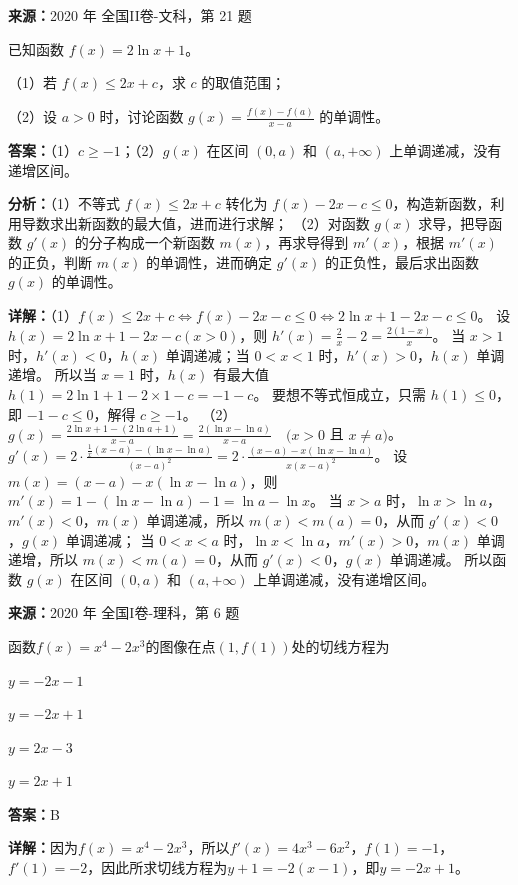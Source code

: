 \begin{question}[points=12]
\textbf{来源：}2020 年 全国II卷-文科，第 21 题\par
已知函数 $f(x)=2\ln x+1$。

（1）若 $f(x)\le 2x+c$，求 $c$ 的取值范围；

（2）设 $a>0$ 时，讨论函数 $g(x)=\frac{f(x)-f(a)}{x-a}$ 的单调性。
\begin{solution}
\textbf{答案：}（1）$c\ge -1$；（2）$g(x)$ 在区间 $(0,a)$ 和 $(a,+\infty)$ 上单调递减，没有递增区间。

\textbf{分析：}（1）不等式 $f(x)\le 2x+c$ 转化为 $f(x)-2x-c\le 0$，构造新函数，利用导数求出新函数的最大值，进而进行求解；
（2）对函数 $g(x)$ 求导，把导函数 $g'(x)$ 的分子构成一个新函数 $m(x)$，再求导得到 $m'(x)$，根据 $m'(x)$ 的正负，判断 $m(x)$ 的单调性，进而确定 $g'(x)$ 的正负性，最后求出函数 $g(x)$ 的单调性。

\textbf{详解：}（1）$f(x)\le 2x+c \Leftrightarrow f(x)-2x-c\le 0 \Leftrightarrow 2\ln x+1-2x-c\le 0$。
设 $h(x)=2\ln x+1-2x-c(x>0)$，则 $h'(x)=\frac{2}{x}-2=\frac{2(1-x)}{x}$。
当 $x>1$ 时，$h'(x)<0$，$h(x)$ 单调递减；当 $0<x<1$ 时，$h'(x)>0$，$h(x)$ 单调递增。
所以当 $x=1$ 时，$h(x)$ 有最大值 $h(1)=2\ln1+1-2\times1-c=-1-c$。
要想不等式恒成立，只需 $h(1)\le 0$，即 $-1-c\le 0$，解得 $c\ge -1$。
（2）$g(x)=\frac{2\ln x+1-(2\ln a+1)}{x-a}=\frac{2(\ln x-\ln a)}{x-a} \quad (x>0$ 且 $x\neq a)$。
$g'(x)=2\cdot\frac{\frac{1}{x}(x-a)-(\ln x-\ln a)}{(x-a)^2}=2\cdot\frac{(x-a)-x(\ln x-\ln a)}{x(x-a)^2}$。
设 $m(x)= (x-a)-x(\ln x-\ln a)$，则 $m'(x)=1-(\ln x-\ln a)-1 = \ln a - \ln x$。
当 $x>a$ 时，$\ln x>\ln a$，$m'(x)<0$，$m(x)$ 单调递减，所以 $m(x)<m(a)=0$，从而 $g'(x)<0$，$g(x)$ 单调递减；
当 $0<x<a$ 时，$\ln x<\ln a$，$m'(x)>0$，$m(x)$ 单调递增，所以 $m(x)<m(a)=0$，从而 $g'(x)<0$，$g(x)$ 单调递减。
所以函数 $g(x)$ 在区间 $(0,a)$ 和 $(a,+\infty)$ 上单调递减，没有递增区间。
\end{solution}
\end{question}

\begin{question}[points=5]
\textbf{来源：}2020 年 全国I卷-理科，第 6 题\par
函数$f(x)=x^4-2x^3$的图像在点$(1,f(1))$处的切线方程为
\begin{choices}
  \item $y=-2x-1$
  \item $y=-2x+1$
  \item $y=2x-3$
  \item $y=2x+1$
\end{choices}
\begin{solution}
\textbf{答案：}B

\textbf{详解：}因为$f(x)=x^4-2x^3$，所以$f'(x)=4x^3-6x^2$，$f(1)=-1$，$f'(1)=-2$，因此所求切线方程为$y+1=-2(x-1)$，即$y=-2x+1$。
\end{solution}
\end{question}

